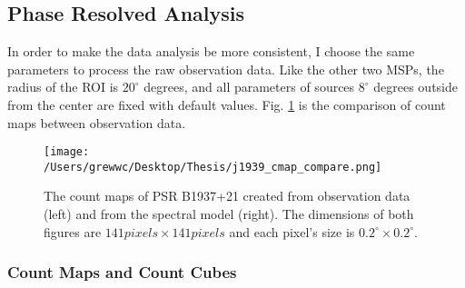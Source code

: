 \documentclass[12pt]{report}
\begin{document}
          \subsection{Phase Resolved Analysis}
          In order to make the data analysis be more consistent, I choose the same parameters
          to process the raw observation data. Like the other two MSPs, the radius of the ROI 
          is $20^{\circ}$ degrees, and all parameters of sources $8^{\circ}$ degrees outside 
          from the center are fixed with default values. Fig. \ref{fig: j1939_count_map} is 
          the comparison of count maps between observation data.
          \begin{figure}
            \centering 
            \texttt{[image: /Users/grewwc/Desktop/Thesis/j1939\_cmap\_compare.png]}
            \caption{The count maps of PSR B1937+21 created from observation 
              data (\textsf{left}) and from the spectral model (\textsf{right}). The dimensions
              of both figures are $141 pixels \times 141 pixels$ and each pixel's size is
              $0.2^{\circ}\times0.2^{\circ}$.}
            \label{fig: j1939_count_map}
          \end{figure}
          \subsubsection{Count Maps and Count Cubes}
 
\end{document}
